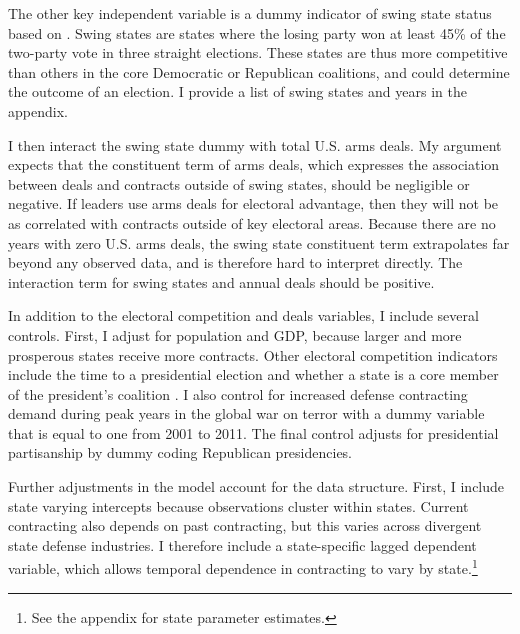 \documentclass[12pt]{article}
\begin{document}
The other key independent variable is a dummy indicator of swing state status based on \citet{KrinerReeves2015}.
Swing states are states where the losing party won at least 45\% of the two-party vote in three straight elections.
These states are thus more competitive than others in the core Democratic or Republican coalitions, and could determine the outcome of an election.
I provide a list of swing states and years in the appendix.   


I then interact the swing state dummy with total U.S. arms deals. 
My argument expects that the constituent term of arms deals, which expresses the association between deals and contracts outside of swing states, should be negligible or negative.
If leaders use arms deals for electoral advantage, then they will not be as correlated with contracts outside of key electoral areas. 
Because there are no years with zero U.S. arms deals, the swing state constituent term extrapolates far beyond any observed data, and is therefore hard to interpret directly. 
The interaction term for swing states and annual deals should be positive.


In addition to the electoral competition and deals variables, I include several controls. 
First, I adjust for population and GDP, because larger and more prosperous states receive more contracts. 
Other electoral competition indicators include the time to a presidential election and whether a state is a core member of the president's coalition \citep{KrinerReeves2015}. 
I also control for increased defense contracting demand during peak years in the global war on terror with a dummy variable that is equal to one from 2001 to 2011. 
The final control adjusts for presidential partisanship by dummy coding Republican presidencies. 


Further adjustments in the model account for the data structure.
First, I include state varying intercepts because observations cluster within states. 
Current contracting also depends on past contracting, but this varies across divergent state defense industries. 
I therefore include a state-specific lagged dependent variable, which allows temporal dependence in contracting to vary by state.\footnote{See the appendix for state parameter estimates.}


\end{document}
